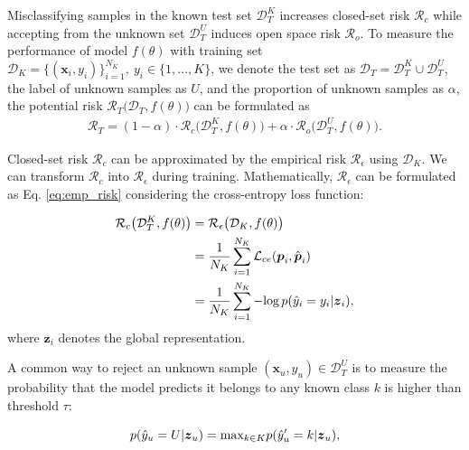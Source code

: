 \documentclass[letterpaper]{article} %
\begin{document}
Misclassifying samples in the known test set $\mathcal{D}_T^K$ increases closed-set risk $\mathcal{R}_c$ while accepting from the unknown set $\mathcal{D}_T^U$ induces open space risk $\mathcal{R}_o$. To measure the performance of model $f(\theta)$ with training set $\mathcal{D}_K=\{(\boldsymbol{x}_i, y_i)\}^{N_K}_{i=1},\ y_i\in\{1,...,K\}$, we denote the test set as $\mathcal{D}_T=\mathcal{D}_T^K\cup\mathcal{D}_T^U$, the label of unknown samples as $U$, and the proportion of unknown samples as $\alpha$, the potential risk $\mathcal{R}_T\big(\mathcal{D}_T,f(\theta)\big)$ can be formulated as
\begin{equation}
\begin{aligned}
    \mathcal{R}_T=(1-\alpha)\cdot\mathcal{R}_c\big(\mathcal{D}^K_T,f(\theta)\big)+\alpha\cdot\mathcal{R}_o\big(\mathcal{D}^U_T,f(\theta)\big).  
\label{eq:base_target}
\end{aligned}
\end{equation}

Closed-set risk $\mathcal{R}_c$ can be approximated by the empirical risk $\mathcal{R}_\epsilon$ using $\mathcal{D}_K$. We can transform $\mathcal{R}_c$ into $\mathcal{R}_\epsilon$ during training. Mathematically, $\mathcal{R}_\epsilon$ can be formulated as Eq. \eqref{eq:emp_risk} considering the cross-entropy loss function:

\begin{equation}
\begin{aligned}
\mathcal{R}_c\big(\mathcal{D}^K_T,f(\theta)\big)&=\mathcal{R}_\epsilon\big(\mathcal{D}_K,f(\theta)\big)\\&=\frac1{N_K}\sum^{N_K}_{i=1}\mathcal{L}_{ce}(\boldsymbol{p}_i,\hat{\boldsymbol{p}}_i)\\&=\frac1{N_K}\sum^{N_K}_{i=1}-{\rm log}\,p(\hat{y}_i=y_i|\boldsymbol{z}_i),
\label{eq:emp_risk}
\end{aligned}
\end{equation}
where $\boldsymbol{z}_i$ denotes the global representation.

A common way to reject an unknown sample $(\boldsymbol{x}_u,y_u)\in\mathcal{D}_T^U$ is to measure the probability that the model predicts it belongs to any known class $k$ is higher than threshold $\tau$: 

\begin{equation}
p(\hat{y}_u=U|\boldsymbol{z}_u)={\rm max}_{k\in K}p(\hat{y}'_u=k|\boldsymbol{z}_u),
\label{eq:prob_unknown}
\end{equation}
\end{document}
